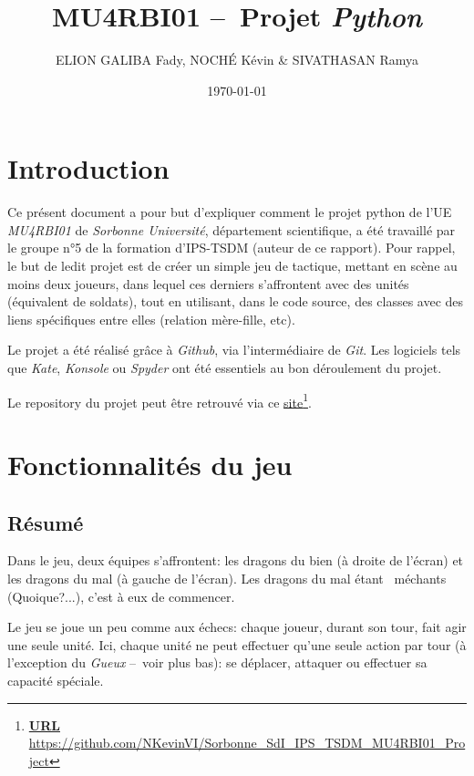 \documentclass[11pt, a4paper, oneside, portrait]{article}
\author{E{\small{}LION} G{\small{}ALIBA} Fady, N{\small{}OCHÉ} Kévin \&{} S{\small{}IVATHASAN} Ramya}
\title{\textbf{MU4RBI01 --~Projet \emph{Python}}}
\date{\today}
\begin{document}
    \justifying
    \maketitle\thispagestyle{fancy}

    \section*{Introduction}
        Ce présent document a pour but d'expliquer comment le projet python de l'UE \emph{MU4RBI01} de \emph{Sorbonne Université}, département scientifique, a été travaillé par le groupe n°5 de la formation d'IPS-TSDM (auteur de ce rapport).
        Pour rappel, le but de ledit projet est de créer un simple jeu de tactique, mettant en scène au moins deux joueurs, dans lequel ces derniers s'affrontent avec des unités (équivalent de soldats), tout en utilisant, dans le code source, des classes avec des liens spécifiques entre elles (relation mère-fille, etc).

        Le projet a été réalisé grâce à \emph{Github}, via l'intermédiaire de \emph{Git}.
        Les logiciels tels que \emph{Kate}, \emph{Konsole} ou \emph{Spyder} ont été essentiels au bon déroulement du projet. %

        Le repository du projet peut être retrouvé via ce \href{https://github.com/NKevinVI/Sorbonne\_SdI\_IPS\_TSDM\_MU4RBI01\_Project}{site}\footnote{\textbf{\underline{URL}}\\\url{https://github.com/NKevinVI/Sorbonne\_SdI\_IPS\_TSDM\_MU4RBI01\_Project}}.

    \section*{Fonctionnalités du jeu}
        \subsection*{Résumé}
            Dans le jeu, deux équipes s'affrontent: les dragons du bien (à droite de l'écran) et les dragons du mal (à gauche de l'écran).
            Les dragons du mal étant \guillemotleft{}~méchants~\guillemotright{} (Quoique?...), c'est à eux de commencer.

            Le jeu se joue un peu comme aux échecs: chaque joueur, durant son tour, fait agir une seule unité.
            Ici, chaque unité ne peut effectuer qu'une seule action par tour (à l'exception du \emph{Gueux} --~voir plus bas): se déplacer, attaquer ou effectuer sa capacité spéciale.
\end{document}
